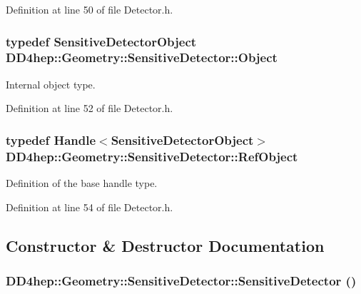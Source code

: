 Definition at line 50 of file Detector.h.\hypertarget{class_d_d4hep_1_1_geometry_1_1_sensitive_detector_a0d3dbe95cad52849050e35e70a5cf784}{
\subsubsection[{Object}]{\setlength{\rightskip}{0pt plus 5cm}typedef {\bf SensitiveDetectorObject} {\bf DD4hep::Geometry::SensitiveDetector::Object}}}
\label{class_d_d4hep_1_1_geometry_1_1_sensitive_detector_a0d3dbe95cad52849050e35e70a5cf784}


Internal object type. 

Definition at line 52 of file Detector.h.\hypertarget{class_d_d4hep_1_1_geometry_1_1_sensitive_detector_a6283afdc6a1de8128bd6aea54f030014}{
\subsubsection[{RefObject}]{\setlength{\rightskip}{0pt plus 5cm}typedef {\bf Handle}$<${\bf SensitiveDetectorObject}$>$ {\bf DD4hep::Geometry::SensitiveDetector::RefObject}}}
\label{class_d_d4hep_1_1_geometry_1_1_sensitive_detector_a6283afdc6a1de8128bd6aea54f030014}


Definition of the base handle type. 

Definition at line 54 of file Detector.h.

\subsection{Constructor \& Destructor Documentation}
\hypertarget{class_d_d4hep_1_1_geometry_1_1_sensitive_detector_a7582e36657fd4099441d82cdf12fe638}{
\subsubsection[{SensitiveDetector}]{\setlength{\rightskip}{0pt plus 5cm}DD4hep::Geometry::SensitiveDetector::SensitiveDetector ()}}
\label{class_d_d4hep_1_1_geometry_1_1_sensitive_detector_a7582e36657fd4099441d82cdf12fe638}


